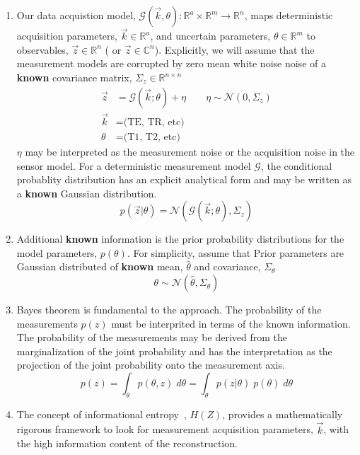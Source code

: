 \documentclass{article}         %
\theoremstyle{definition}
\theoremstyle{remark}
\begin{document}
\begin{enumerate}
  \item Our data acquistion model, $\mathcal{G}(\vec{k},\theta): \mathbb{R}^a
\times \mathbb{R}^m \rightarrow \mathbb{R}^n $,
maps deterministic acquisition
parameters, $\vec{k} \in \mathbb{R}^a$, and uncertain parameters, $\theta \in \mathbb{R}^m$
to observables, $\vec{z} \in \mathbb{R}^n$ ( or $\vec{z} \in \mathbb{C}^n$).
Explicitly, we will assume that the
measurement models are corrupted by zero mean white noise noise of a
\textbf{known} covariance matrix, $\Sigma_z \in \mathbb{R}^{n \times n}$ 
\begin{equation}
\label{sensormodelstructure}
\begin{split}
  \vec{z} & = \mathcal{G}(\vec{k};\theta) + \eta   \qquad   \eta \sim \mathcal{N}(0,\Sigma_z)
      \\
  \vec{k} & =  \text{(TE, TR, etc)}
      \\
  \theta &  =  \text{(T1, T2, etc)}
     \end{split}
\end{equation}
$\eta$ may be interpreted as the measurement noise or the acquisition noise
in the sensor model. For a deterministic measurement model $\mathcal{G}$,
the conditional probablity distribution has an explicit analytical form
and may be written as a  \textbf{known} Gaussian
distribution. 
  \[ 
      p(\vec{z}|\theta)   =  \mathcal{N}(\mathcal{G}(\vec{k};\theta),\Sigma_z)  
  \]
  \item Additional \textbf{known} information is the prior probability
distributions for the model parameters, $p(\theta)$.  For simplicity,
    assume that Prior parameters are Gaussian distributed of 
   \textbf{known} mean, $\hat{\theta}$ and covariance, $\Sigma_\theta$
   \[
      \theta \sim \mathcal{N} (\hat{\theta}, \Sigma_\theta)
   \]
  \item Bayes theorem is fundamental to the approach.
The probability of the measurements $p(z)$ must be interprited in terms of the
known information. The probability of the measurements may be derived from
the marginalization of the joint probability and has the interpretation as
the projection of the joint probability onto the measurement axis.
\[
  p(z) = \int_\theta p(\theta,z)  \; d\theta 
       = \int_\theta p(z|\theta) \; p(\theta)\; d\theta 
\]
  \item  The concept of informational entropy~\cite{Madankan15}, $H(Z)$,
provides a mathematically rigorous framework to look for measurement acquisition
parameters, $\vec{k}$, with the high information content of the reconstruction.

\end{enumerate}
\end{document}

